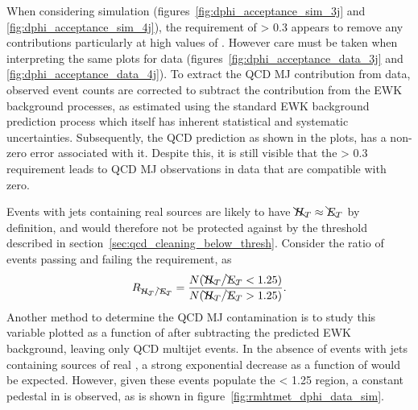 % 
When considering simulation (figures~\ref{fig:dphi_acceptance_sim_3j} and
\ref{fig:dphi_acceptance_sim_4j}), the requirement of \mindphistar > 0.3 appears
to remove any contributions particularly at high values of \alphat. However care
must be taken when interpreting the same plots for data
(figures~\ref{fig:dphi_acceptance_data_3j} and
\ref{fig:dphi_acceptance_data_4j}). To extract the QCD MJ contribution from
data,
observed event counts are corrected to subtract the contribution from the EWK
background processes, as estimated using the standard EWK background prediction
process which itself has inherent statistical and systematic uncertainties.
Subsequently, the QCD prediction as shown in the plots, has a non-zero error
associated
with it. Despite this, it is still visible that the \mindphistar > 0.3
requirement
leads to QCD MJ observations in data that are compatible with zero.

Events with jets containing real \met sources are likely to have
$\bcancel{H}_T \approx \bcancel{E}_T$ by definition, and would therefore not be protected against
by the \mhtmet threshold
described in section~\ref{sec:qcd_cleaning_below_thresh}. Consider the ratio
of events passing and failing the \mhtmet requirement, as
% 
\begin{equation}
\label{eq:rmhtmet}
R_{\bcancel{H}_T / \bcancel{E}_T} = \frac{N(\bcancel{H}_T / \bcancel{E}_T<1.25)}{N(\bcancel{H}_T / \bcancel{E}_T>1.25)}.
\end{equation}
% 
Another method to determine the QCD MJ contamination is to study this variable
plotted as a function of \alphat after subtracting the
predicted EWK background, leaving only QCD multijet events.
In the absence of events with jets containing sources of real \met, a strong
exponential decrease as a function of \alphat would be expected. However, given
these events populate the
\mhtmet < 1.25 region, a constant pedestal in \alphat is observed, as is shown
in figure~\ref{fig:rmhtmet_dphi_data_sim}.

